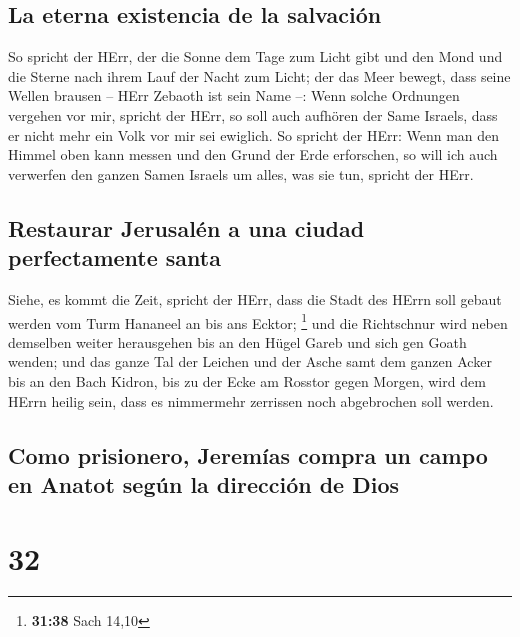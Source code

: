 \hypertarget{la-eterna-existencia-de-la-salvaciuxf3n}{%
\subsection{La eterna existencia de la
salvación}\label{la-eterna-existencia-de-la-salvaciuxf3n}}

 So spricht der HErr, der die Sonne dem Tage zum Licht
gibt und den Mond und die Sterne nach ihrem Lauf der Nacht zum Licht;
der das Meer bewegt, dass seine Wellen brausen -- HErr Zebaoth ist sein
Name --:  Wenn solche Ordnungen vergehen vor mir, spricht
der HErr, so soll auch aufhören der Same Israels, dass er nicht mehr ein
Volk vor mir sei ewiglich.  So spricht der HErr: Wenn man
den Himmel oben kann messen und den Grund der Erde erforschen, so will
ich auch verwerfen den ganzen Samen Israels um alles, was sie tun,
spricht der HErr.

\hypertarget{restaurar-jerusaluxe9n-a-una-ciudad-perfectamente-santa}{%
\subsection{Restaurar Jerusalén a una ciudad perfectamente
santa}\label{restaurar-jerusaluxe9n-a-una-ciudad-perfectamente-santa}}

 Siehe, es kommt die Zeit, spricht der HErr, dass die
Stadt des HErrn soll gebaut werden vom Turm Hananeel an bis ans Ecktor;
\footnote{\textbf{31:38} Sach 14,10}  und die Richtschnur
wird neben demselben weiter herausgehen bis an den Hügel Gareb und sich
gen Goath wenden;  und das ganze Tal der Leichen und der
Asche samt dem ganzen Acker bis an den Bach Kidron, bis zu der Ecke am
Rosstor gegen Morgen, wird dem HErrn heilig sein, dass es nimmermehr
zerrissen noch abgebrochen soll werden.

\hypertarget{como-prisionero-jeremuxedas-compra-un-campo-en-anatot-seguxfan-la-direcciuxf3n-de-dios}{%
\subsection{Como prisionero, Jeremías compra un campo en Anatot según la
dirección de
Dios}\label{como-prisionero-jeremuxedas-compra-un-campo-en-anatot-seguxfan-la-direcciuxf3n-de-dios}}

\hypertarget{section-31}{%
\section{32}\label{section-31}}

